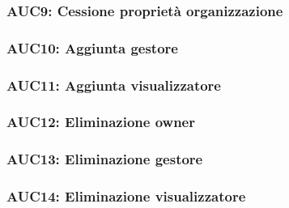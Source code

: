 \documentclass[../analisi-dei-requisiti.tex]{subfiles}
\begin{document}


\subsubsection{AUC9: Cessione proprietà organizzazione}%
\label{subs:AUC9}



\subsubsection{AUC10: Aggiunta gestore}%
\label{subs:AUC10}



\subsubsection{AUC11: Aggiunta visualizzatore}%
\label{subs:AUC10}



\subsubsection{AUC12: Eliminazione owner}%
\label{subs:AUC12}



\subsubsection{AUC13: Eliminazione gestore}%
\label{subs:AUC13}



\subsubsection{AUC14: Eliminazione visualizzatore}%
\label{subs:AUC14}


\end{document}
